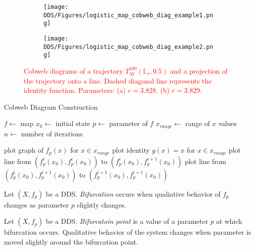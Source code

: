 \begin{figure}[!h]
    \centering
    \begin{subfigure}{0.495\textwidth}
        \centering
        \texttt{[image: DDS/Figures/logistic\_map\_cobweb\_diag\_example1.png]}
        \caption{}
    \end{subfigure}
    \hfill
    \begin{subfigure}{0.495\textwidth}
        \centering
        \texttt{[image: DDS/Figures/logistic\_map\_cobweb\_diag\_example2.png]}
        \caption{}
    \end{subfigure}

    \caption{
        \textcolor{red}{
        Cobweb diagrams of a trajectory $T_{50}^{100}(\mathbb{L}_{r}, 0.5)$ and a projection of the trajectory onto a line. 
        Dashed diagonal line represents the identity function. 
        Parameters: 
        (a) $r = 3.828$. 
        (b) $r = 3.829$. 
        }
        }
    \label{fig:cobweb_diag_example}
\end{figure}


\begin{algorithm}
\caption{Cobweb Diagram Construction}\label{cobweb_alg}
\begin{algorithmic}[1]
\Statex $f \gets$ map
\Statex $x_0 \gets$ initial state
\Statex $p \gets$ parameter of $f$
\Statex $x_{range} \gets$ range of $x$ values
\Statex $n \gets$ number of iterations

\State plot graph of $f_p(x)$ for $x \in x_{range}$
\State plot identity $g(x)=x$ for $x \in x_{range}$
\State plot line from $(f_{p}^{i}(x_0), f_{p}^{i}(x_0))$ to $(f_{p}^{i}(x_0), f_{p}^{i+1}(x_0))$
\State plot line from $(f_{p}^{i}(x_0), f_{p}^{i+1}(x_0))$ to $(f_{p}^{i+1}(x_0), f_{p}^{i+1}(x_0))$
\EndFor

\end{algorithmic}
\end{algorithm}

\label{def:bifurcation}
\begin{definition}[Bifurcation]
    Let $\left( X, f_p \right)$ be a DDS.
    \emph{Bifurcation} occurs when qualiative behavior of $f_p$ changes as parameter $p$ slightly changes.
\end{definition}

\label{def:bifurcation_point}
\begin{definition}
    Let $\left( X, f_p \right)$ be a DDS.
    \emph{Bifurcatoin point} is a value of a parameter $p$ at which bifurcation occurs.
    Qualitative behavior of the system changes when parameter is moved slightly around the bifurcation point.
\end{definition}

